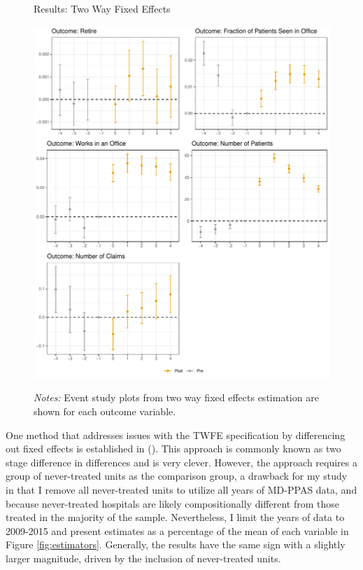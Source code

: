 \documentclass[12pt]{article}
\begin{document}
\begin{figure}
    \centering
    \captionsetup{width=.8\linewidth}
    \caption{Results: Two Way Fixed Effects}
    \includegraphics[scale=.6]{Objects/twfe_plot.pdf}
    \label{fig:twfe}
    \vspace{2mm}
    \caption*{\footnotesize{\textit{Notes:} Event study plots from two way fixed effects estimation are shown for each outcome variable.}}
\end{figure}

One method that addresses issues with the TWFE specification by differencing out fixed effects is established in \citeauthor{gardner2021two} (\citeyear{gardner2021two}). This approach is commonly known as two stage difference in differences and is very clever. However, the approach requires a group of never-treated units as the comparison group, a drawback for my study in that I remove all never-treated units to utilize all years of MD-PPAS data, and because never-treated hospitals are likely compositionally different from those treated in the majority of the sample. Nevertheless, I limit the years of data to 2009-2015 and present estimates as a percentage of the mean of each variable in Figure \ref{fig:estimators}. Generally, the results have the same sign with a slightly larger magnitude, driven by the inclusion of never-treated units. 
\end{document}
